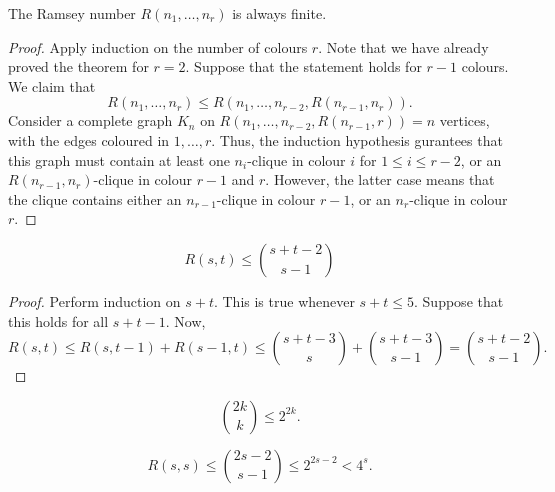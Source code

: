 \documentclass[11pt]{article}
\theoremstyle{definition}
\theoremstyle{remark}
\numberwithin{equation}{section}
\begin{document}
    \begin{theorem}
        The Ramsey number $R(n_1, \dots, n_r)$ is always finite.
    \end{theorem}
    \begin{proof}
        Apply induction on the number of colours $r$. Note that we have already
        proved the theorem for $r = 2$. Suppose that the statement holds for $r - 1$
        colours. We claim that \[
            R(n_1, \dots, n_r) \leq R(n_1, \dots, n_{r - 2}, R(n_{r - 1}, n_r)).
        \] Consider a complete graph $K_n$ on $R(n_1, \dots, n_{r - 2}, R(n_{r - 1},
        r)) = n$ vertices, with the edges coloured in $1, \dots, r$. Thus, the
        induction hypothesis gurantees that this graph must contain at least one
        $n_i$-clique in colour $i$ for $1 \leq i \leq r - 2$, or an $R(n_{r - 1},
        n_r)$-clique in colour $r-1$ and $r$. However, the latter case means that the
        clique contains either an $n_{r - 1}$-clique in colour $r - 1$, or an
        $n_r$-clique in colour $r$.
    \end{proof}

    \begin{theorem}
        \[
            R(s, t) \leq \binom{s + t - 2}{s - 1}
        \] 
    \end{theorem}
    \begin{proof}
        Perform induction on $s + t$. This is true whenever $s + t \leq 5$. Suppose
        that this holds for all $s + t - 1$. Now, \[
            R(s, t) \leq R(s, t - 1) + R(s - 1, t) \leq \binom{s + t - 3}{s} +
            \binom{s + t - 3}{s - 1} = \binom{s + t - 2}{s - 1}.
        \] 
    \end{proof}

    \begin{lemma}
        \[
           \binom{2k}{k} \leq 2^{2k}.
        \] 
    \end{lemma}
    \begin{corollary}
        \[
            R(s, s) \leq \binom{2s - 2}{s - 1} \leq 2^{2s - 2} < 4^s.
        \] 
    \end{corollary}
\end{document}

